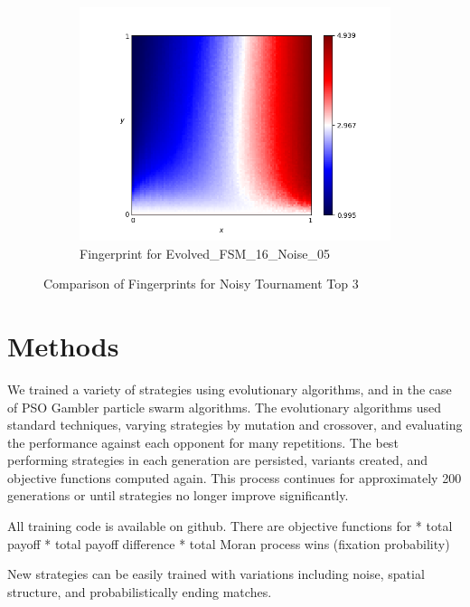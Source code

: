 \documentclass{article}
\begin{document}
\begin{figure}[!hbtp]
\begin{subfigure}[t]{.3\textwidth}
        \includegraphics[width=\textwidth]{./assets/Evolved_FSM_16_Noise_05.png}
        \caption{Fingerprint for Evolved\_FSM\_16\_Noise\_05}
    \end{subfigure}%

    \caption{Comparison of Fingerprints for Noisy Tournament Top 3}
    \label{fig:comparison_fingerprint_noisy}
\end{figure}



\section{Methods}

We trained a variety of strategies using evolutionary algorithms, and in the
case of PSO Gambler particle swarm algorithms. The evolutionary algorithms
used standard techniques, varying strategies by mutation and crossover, and
evaluating the performance against each opponent for many repetitions. The
best performing strategies in each generation are persisted, variants created,
and objective functions computed again. This process continues for approximately
200 generations or until strategies no longer improve significantly.


All training code is available on github. There are objective functions for
* total payoff
* total payoff difference
* total Moran process wins (fixation probability)

New strategies can be easily trained with variations including noise, spatial
structure, and probabilistically ending matches.
\end{document}
